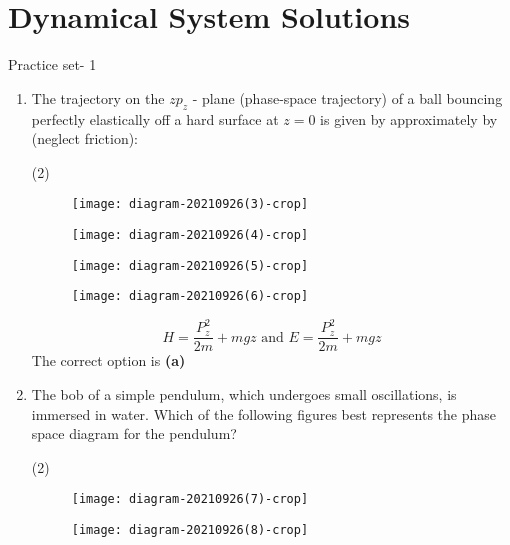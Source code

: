 \chapter{Dynamical System Solutions}
\begin{abox}
	Practice set- 1 
	\end{abox}
\begin{enumerate}
	\item The trajectory on the $z p_{z}$ - plane (phase-space trajectory) of a ball bouncing perfectly elastically off a hard surface at $z=0$ is given by approximately by (neglect friction):
	{}
\begin{tasks}(2)
	\task[\textbf{A.}]\begin{figure}[H]
		\centering
		\texttt{[image: diagram-20210926(3)-crop]}
	\end{figure}
	\task[\textbf{B.}]\begin{figure}[H]
		\centering
		\texttt{[image: diagram-20210926(4)-crop]}
	\end{figure}
	\task[\textbf{C.}]\begin{figure}[H]
		\centering
		\texttt{[image: diagram-20210926(5)-crop]}
	\end{figure}
	\task[\textbf{D.}]\begin{figure}[H]
		\centering
		\texttt{[image: diagram-20210926(6)-crop]}
	\end{figure}
\end{tasks}
\begin{answer}
	$$H=\frac{P_{z}^{2}}{2 m}+m g z \text { and } E=\frac{P_{z}^{2}}{2 m}+m g z$$
	The correct option is \textbf{(a)}
\end{answer}
	\item The bob of a simple pendulum, which undergoes small oscillations, is immersed in water. Which of the following figures best represents the phase space diagram for the pendulum?
	{}
\begin{tasks}(2)
	\task[\textbf{A.}]\begin{figure}[H]
		\centering
		\texttt{[image: diagram-20210926(7)-crop]}
	\end{figure}
	\task[\textbf{B.}]\begin{figure}[H]
		\centering
		\texttt{[image: diagram-20210926(8)-crop]}
	\end{figure}
	\task[\textbf{C.}]\begin{figure}[H]

\end{figure}
\end{tasks}
\end{enumerate}
